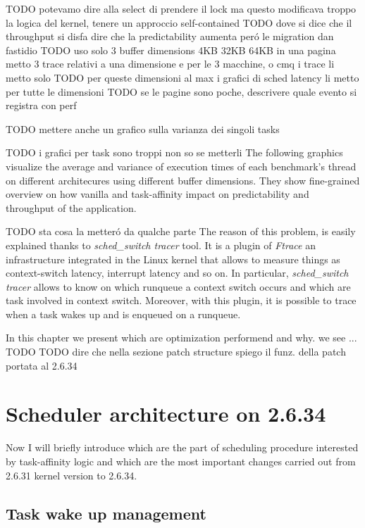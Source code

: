 TODO potevamo dire alla select di prendere il lock ma questo modificava troppo la logica del kernel, tenere un approccio self-contained
TODO dove si dice che il throughput si disfa dire che la predictability aumenta per\'o le migration dan fastidio
TODO uso solo 3 buffer dimensions 4KB 32KB 64KB in una pagina metto 3 trace relativi a una dimensione e per le 3 macchine, o cmq i trace li metto solo
TODO per queste dimensioni al max i grafici di sched latency li metto per tutte le dimensioni
TODO se le pagine sono poche, descrivere quale evento si registra con perf

TODO mettere anche un grafico sulla varianza dei singoli tasks

TODO i grafici per task sono troppi non so se metterli
The following graphics visualize the average and variance of execution times of each benchmark's thread on different architecures using different buffer 
dimensions. They show fine-grained overview on how vanilla and task-affinity impact on predictability and throughput of the application.


TODO sta cosa la metter\'o da qualche parte
The reason of this problem, is easily explained thanks to \textit{sched\_switch tracer} tool. It is a plugin of \textit{Ftrace} an infrastructure integrated
in the Linux kernel that allows to measure things as context-switch latency, interrupt latency and so on. In particular, \textit{sched\_switch tracer} 
allows to know on which runqueue a context switch occurs and which are task involved in context switch. Moreover, with this plugin, it is possible to 
trace when a task wakes up and is enqueued on a runqueue.

In this chapter we present which are optimization performend and why. we see ... TODO 
TODO dire che nella sezione patch structure spiego il funz. della patch portata al 2.6.34

\section{Scheduler architecture on 2.6.34}

Now I will briefly introduce which are the part of scheduling procedure 
interested by task-affinity logic and which are the most important changes 
carried out from 2.6.31 kernel version to 2.6.34.

\subsection{Task wake up management}

